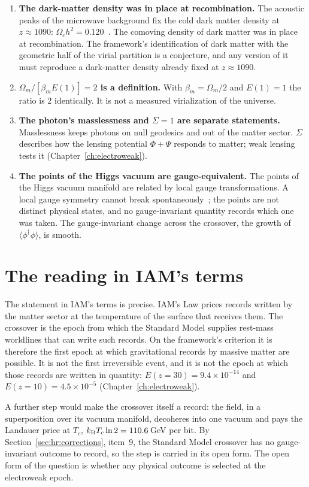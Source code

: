 \begin{enumerate}
\item \textbf{The dark-matter density was in place at recombination.} The acoustic peaks of the microwave background fix the cold dark matter
density at $z\approx1090$: $\Omega_ch^2=0.120$~\cite{Planck2018VI}. The comoving density of dark matter was in place at recombination. \observed{} The
framework's identification of dark matter with the geometric half of the virial partition is a conjecture, and any version of it must reproduce
a dark-matter density already fixed at $z\approx1090$. \conjecture
\item \textbf{$\Omega_m/[\beta_mE(1)]=2$ is a definition.} With $\beta_m=\Omega_m/2$ and $E(1)=1$ the ratio is 2 identically. It is not a measured
virialization of the universe. \derived
\item \textbf{The photon's masslessness and $\Sigma=1$ are separate statements.} Masslessness keeps photons on null geodesics and out of the matter sector. $\Sigma$
describes how the lensing potential $\Phi+\Psi$ responds to matter; weak lensing tests it (Chapter~\ref{ch:electroweak}). \derived
\item \textbf{The points of the Higgs vacuum are gauge-equivalent.} The points of the Higgs vacuum manifold are related by local gauge transformations. A local gauge
symmetry cannot break spontaneously~\cite{Elitzur1975}; the points are not distinct physical states, and no gauge-invariant quantity records which
one was taken. The gauge-invariant change across the crossover, the growth of $\langle\phi^\dagger\phi\rangle$, is smooth. \derived
\end{enumerate}

\section{The reading in IAM's terms}\label{sec:hr:reading}
The statement in IAM's terms is precise. IAM's Law prices records written by the matter sector at the temperature of the surface that receives
them. The crossover is the epoch from which the Standard Model supplies rest-mass worldlines that can write such records. On the framework's
criterion it is therefore the first epoch at which gravitational records by massive matter are possible. \interp{} It is not the first irreversible
event, and it is not the epoch at which those records are written in quantity: $E(z{=}30)=9.4\times10^{-14}$ and $E(z{=}10)=4.5\times10^{-5}$
(Chapter~\ref{ch:electroweak}). \calc

A further step would make the crossover itself a record: the field, in a superposition over its vacuum manifold, decoheres into one vacuum and pays
the Landauer price at $T_c$, $k_{\mathrm B} T_c\ln2=110.6$\,GeV per bit. \calc{} By Section~\ref{sec:hr:corrections}, item~9, the Standard Model crossover has no gauge-invariant outcome to record, so the step is carried in its
open form. \conjecture{} The open form of the question is whether any physical outcome is selected at the electroweak epoch. \openprob

